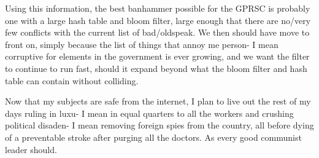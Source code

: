 \documentclass[11pt]{article}
\begin{document}
Using this information, the best banhammer possible for the GPRSC is probably one with a large hash table and bloom filter, large enough that there are no/very few conflicts with the current list of bad/oldspeak. We then should have move to front on, simply because the list of things that annoy me person- I mean corruptive for elements in the government is ever growing, and we want the filter to continue to run fast, should it expand beyond what the bloom filter and hash table can contain without colliding.

Now that my subjects are safe from the internet, I plan to live out the rest of my days ruling in luxu- I mean in equal quarters to all the workers and crushing political disaden- I mean removing foreign spies from the country, all before dying of a preventable stroke after purging all the doctors. As every good communist leader should.
\end{document}

